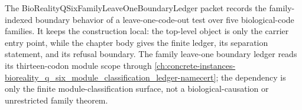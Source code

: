 The BioRealityQSixFamilyLeaveOneBoundaryLedger packet records the family-indexed boundary behavior of a leave-one-code-out test over five biological-code families.  It keeps the construction local: the top-level object is only the carrier entry point, while the chapter body gives the finite ledger, its separation statement, and its refusal boundary. The family leave-one boundary ledger reads its thirteen-codon module scope through \autoref{ch:concrete-instances-bioreality_q_six_module_classification_ledger-namecert}; the dependency is only the finite module-classification surface, not a biological-causation or unrestricted family theorem.


